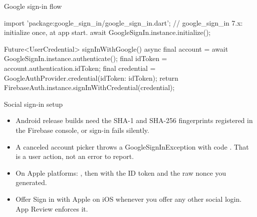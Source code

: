 \documentclass[10pt,aspectratio=169,t]{beamer}
\begin{document}
\begin{frame}[fragile,eyebrow=OAuth]{Google sign-in flow}
\begin{dart}
import 'package:google_sign_in/google_sign_in.dart';
// google_sign_in 7.x: initialize once, at app start.
await GoogleSignIn.instance.initialize();

Future<UserCredential> signInWithGoogle() async {
  final account = await GoogleSignIn.instance.authenticate();
  final idToken = account.authentication.idToken;
  final credential =
      GoogleAuthProvider.credential(idToken: idToken);
  return FirebaseAuth.instance.signInWithCredential(credential);
}
\end{dart}
\end{frame}

\begin{frame}[eyebrow=OAuth]{Social sign-in setup}
  \vskip 3mm
  \begin{itemize}
    \item Android release builds need the SHA-1 and SHA-256 fingerprints registered in the Firebase console, or sign-in fails silently.
    \item A canceled account picker throws a GoogleSignInException with code . That is a user action, not an error to report.
    \item On Apple platforms: , then  with the ID token and the raw nonce you generated.
    \item Offer Sign in with Apple on iOS whenever you offer any other social login. App Review enforces it.
  \end{itemize}
\end{frame}
\end{document}

